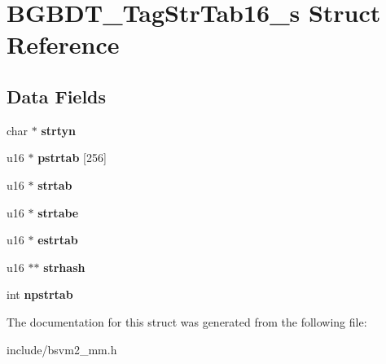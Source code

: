 \hypertarget{structBGBDT__TagStrTab16__s}{\section{B\-G\-B\-D\-T\-\_\-\-Tag\-Str\-Tab16\-\_\-s Struct Reference}
\label{structBGBDT__TagStrTab16__s}
}
\subsection*{Data Fields}
\begin{DoxyCompactItemize}
\item 
\hypertarget{structBGBDT__TagStrTab16__s_a0a46aae869f9cdd37e8a70ce69ec0344}{char $\ast$ {\bfseries strtyn}}\label{structBGBDT__TagStrTab16__s_a0a46aae869f9cdd37e8a70ce69ec0344}

\item 
\hypertarget{structBGBDT__TagStrTab16__s_aabc0faad001fb17c849cc369046be06a}{u16 $\ast$ {\bfseries pstrtab} \mbox{[}256\mbox{]}}\label{structBGBDT__TagStrTab16__s_aabc0faad001fb17c849cc369046be06a}

\item 
\hypertarget{structBGBDT__TagStrTab16__s_ae710a21959487b6059ba6d604188eed1}{u16 $\ast$ {\bfseries strtab}}\label{structBGBDT__TagStrTab16__s_ae710a21959487b6059ba6d604188eed1}

\item 
\hypertarget{structBGBDT__TagStrTab16__s_aca6ca6adbe7c16c4cc4b175bef584b5e}{u16 $\ast$ {\bfseries strtabe}}\label{structBGBDT__TagStrTab16__s_aca6ca6adbe7c16c4cc4b175bef584b5e}

\item 
\hypertarget{structBGBDT__TagStrTab16__s_a10e02e3647d4575a855f35a9a6f4c836}{u16 $\ast$ {\bfseries estrtab}}\label{structBGBDT__TagStrTab16__s_a10e02e3647d4575a855f35a9a6f4c836}

\item 
\hypertarget{structBGBDT__TagStrTab16__s_a440b0a4db35e7ba8d3341a644b1d2225}{u16 $\ast$$\ast$ {\bfseries strhash}}\label{structBGBDT__TagStrTab16__s_a440b0a4db35e7ba8d3341a644b1d2225}

\item 
\hypertarget{structBGBDT__TagStrTab16__s_a991f4167f545174aa610d2033c03a3e0}{int {\bfseries npstrtab}}\label{structBGBDT__TagStrTab16__s_a991f4167f545174aa610d2033c03a3e0}

\end{DoxyCompactItemize}


The documentation for this struct was generated from the following file\-:\begin{DoxyCompactItemize}
\item 
include/bsvm2\-\_\-mm.\-h\end{DoxyCompactItemize}
